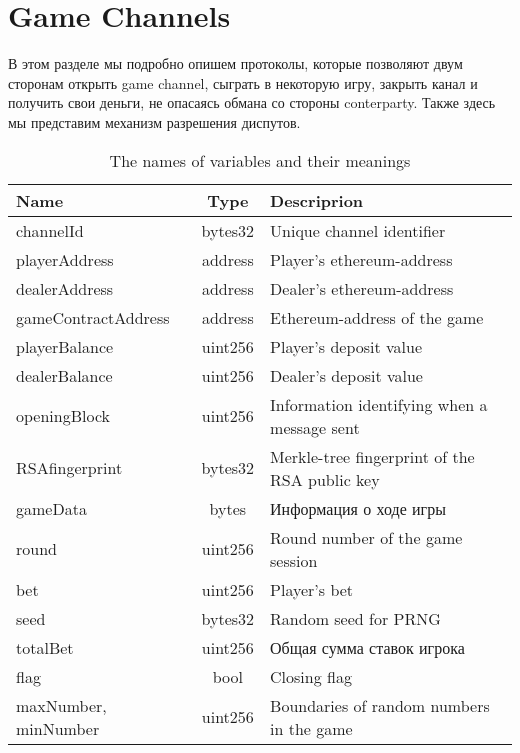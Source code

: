  	\section{Game Channels} \label{gamechannel}
В этом разделе мы подробно опишем протоколы, которые позволяют двум сторонам открыть game channel, сыграть в некоторую игру, закрыть канал и получить свои деньги, не опасаясь обмана со стороны conterparty. Также здесь мы представим механизм разрешения диспутов.\\

\begin{table}[h]

\caption{The names of variables and their meanings}
\begin{tabular}{|l|c|l|}
\hline
Name&Type&Descriprion\\
\hline
channelId & bytes32 & Unique channel identifier\\ 

playerAddress & address & Player's ethereum-address\\            
dealerAddress & address & Dealer's ethereum-address\\  
gameContractAddress & address & Ethereum-address of the game\\             
playerBalance & uint256 & Player's deposit value\\                   
dealerBalance & uint256 & Dealer's deposit value\\                   
openingBlock & uint256 &  Information identifying when a message sent\\                  
RSAfingerprint & bytes32 &  Merkle-tree fingerprint of the RSA public key\\  
gameData & bytes & Информация о ходе игры\\
round & uint256 & Round number of the game session \\
bet & uint256 & Player's bet \\
seed & bytes32 & Random seed for PRNG\\
totalBet & uint256 & Общая сумма ставок игрока \\
flag & bool &Closing flag \\
maxNumber, minNumber & uint256 & Boundaries of random numbers in the game\\
\hline
\end{tabular}
\end{table}

